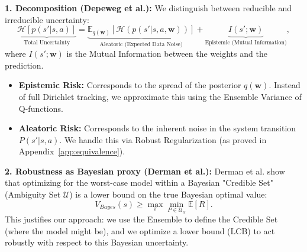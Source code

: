 \textbf{1. Decomposition (Depeweg et al.):}
We distinguish between reducible and irreducible uncertainty:
\begin{equation}
    \underbrace{\mathcal{H}[p(s'|s,a)]}_{\text{Total Uncertainty}} = \underbrace{\mathbb{E}_{q(\mathbf{w})}[\mathcal{H}(p(s'|s,a,\mathbf{w}))]}_{\text{Aleatoric (Expected Data Noise)}} + \underbrace{I(s'; \mathbf{w})}_{\text{Epistemic (Mutual Information)}},
\end{equation}
where $I(s'; \mathbf{w})$ is the Mutual Information between the weights and the prediction.
\begin{itemize}
    \item \textbf{Epistemic Risk:} Corresponds to the spread of the posterior $q(\mathbf{w})$. Instead of full Dirichlet tracking, we approximate this using the Ensemble Variance of Q-functions.
    \item \textbf{Aleatoric Risk:} Corresponds to the inherent noise in the system transition $P(s'|s,a)$. We handle this via Robust Regularization (as proved in Appendix~\ref{app:equivalence}).
\end{itemize}

\textbf{2. Robustness as Bayesian proxy (Derman et al.):}
Derman et al. show that optimizing for the worst-case model within a Bayesian "Credible Set" (Ambiguity Set $\mathcal{U}$) is a lower bound on the true Bayesian optimal value:
\begin{equation}
    V_{Bayes}(s) \ge \max_\pi \min_{P \in \mathcal{U}_\alpha} \mathbb{E}[R].
\end{equation}
This justifies our approach: we use the Ensemble to define the Credible Set (where the model might be), and we optimize a lower bound (LCB) to act robustly with respect to this Bayesian uncertainty.

